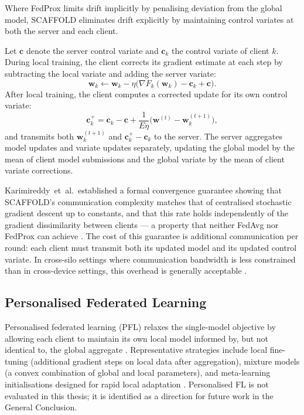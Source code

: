 Where FedProx limits drift implicitly by penalising deviation from
the global model, SCAFFOLD eliminates drift explicitly by maintaining
control variates at both the server and each client.

Let $\mathbf{c}$ denote the server control variate and
$\mathbf{c}_k$ the control variate of client $k$.
During local training, the client corrects its gradient estimate at
each step by subtracting the local variate and adding the server
variate:
\begin{equation}
  \mathbf{w}_k \leftarrow
  \mathbf{w}_k
  - \eta \bigl(
      \nabla F_k(\mathbf{w}_k)
      - \mathbf{c}_k
      + \mathbf{c}
    \bigr).
  \label{eq:scaffold-update}
\end{equation}
After local training, the client computes a corrected update for its
own control variate:
\begin{equation}
  \mathbf{c}_k^{+}
  = \mathbf{c}_k
    - \mathbf{c}
    + \frac{1}{E\eta}
      \bigl(\mathbf{w}^{(t)} - \mathbf{w}_k^{(t+1)}\bigr),
  \label{eq:scaffold-variate}
\end{equation}
and transmits both $\mathbf{w}_k^{(t+1)}$ and
$\mathbf{c}_k^{+} - \mathbf{c}_k$ to the server.
The server aggregates model updates and variate updates separately,
updating the global model by the mean of client model submissions and
the global variate by the mean of client variate corrections.

Karimireddy~et~al.\ established a formal convergence guarantee showing
that SCAFFOLD's communication complexity matches that of centralised
stochastic gradient descent up to constants, and that this rate holds
independently of the gradient dissimilarity between clients — a property
that neither FedAvg nor FedProx can achieve
\cite{karimireddy2020scaffold}.
The cost of this guarantee is additional communication per round:
each client must transmit both its updated model and its updated
control variate.
In cross-silo settings where communication bandwidth is less
constrained than in cross-device settings, this overhead is generally
acceptable \cite{kairouz2021advances}.


\subsection{Personalised Federated Learning}
\label{sec:personalised-fl}

Personalised federated learning (PFL) relaxes the single-model objective by
allowing each client to maintain its own local model informed by, but not
identical to, the global aggregate \cite{kairouz2021advances,ghosh2020clustered}.
Representative strategies include local fine-tuning (additional gradient steps
on local data after aggregation), mixture models (a convex combination of global
and local parameters), and meta-learning initialisations designed for rapid local
adaptation \cite{arbaoui2025survey}.
Personalised FL is not evaluated in this thesis; it is identified as a direction
for future work in the General Conclusion.


